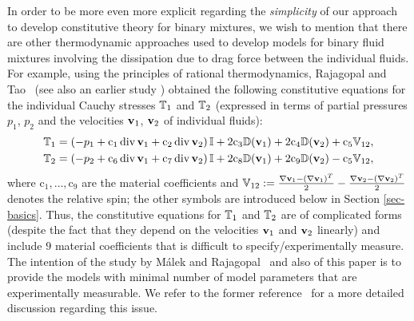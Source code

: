 \documentclass[a4paper]{article}
\begin{document}
In order to be more even more explicit regarding the \textit{simplicity} of our approach to develop constitutive theory for binary mixtures, we wish to mention that there are other thermodynamic approaches used to develop models for binary fluid mixtures involving the dissipation due to drag force between the individual fluids. For example, using the principles of rational thermodynamics, Rajagopal and Tao~\cite{rajagopal.kr.tao.l:mechanics} (see also an earlier study \cite{alsharif1993}) obtained the following constitutive equations for the individual Cauchy stresses $\mathbb{T}_1$ and $\mathbb{T}_2$ (expressed in terms of partial pressures $p_1$, $p_2$ and the velocities ${\bf v}_1$, ${\bf v}_2$ of individual fluids): 
\begin{align}
\nonumber
        \TT_1 & = \left( - p_1 + \mathrm{c}_1 \div\vv_1 + \mathrm{c}_2 \div\vv_2\right)\II + 2\mathrm{c}_3 \DD(\vv_1) + 2\mathrm{c}_4 \DD(\vv_2) + \mathrm{c}_5 \VV_{12}, \\
        \nonumber
        \TT_2 & = \left( - p_2 + \mathrm{c}_6 \div\vv_1 + \mathrm{c}_7 \div\vv_2\right)\II + 2\mathrm{c}_8 \DD(\vv_1) + 2\mathrm{c}_9 \DD(\vv_2) - \mathrm{c}_5 \VV_{12}, %
\end{align}
where $\mathrm{c}_1,\dots,\mathrm{c}_9$ are the material coefficients and  $\mathbb{V}_{12}:= \frac{\nabla {\bf v}_1 - (\nabla {\bf v}_1)^T}{2} - \frac{\nabla {\bf v}_2 - (\nabla {\bf v}_2)^T}{2}$ denotes the relative spin; the other symbols are introduced below in Section \ref{sec-basics}. Thus, the constitutive equations for $\mathbb{T}_1$ and $\mathbb{T}_2$ are of complicated forms (despite the fact that they depend on the velocities ${\bf v}_1$ and ${\bf v}_2$ linearly) and include $9$ material coefficients that is difficult to specify/experimentally measure. The intention of the study by M\'{a}lek and Rajagopal~\cite{malek-2008} and also of this paper is to provide the models with minimal number of model parameters that are experimentally measurable. We refer to the former reference~\cite{malek-2008} for a more detailed discussion regarding this issue. 

\end{document}
